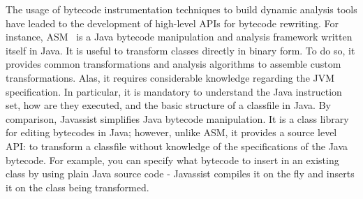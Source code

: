 The usage of bytecode instrumentation techniques to build dynamic analysis tools have leaded to the development of high-level APIs for bytecode rewriting.
For instance, ASM~\cite{Bruneton2002,Kuleshov2007} is a Java bytecode manipulation and analysis framework written itself in Java.
It is useful to transform classes directly in binary form.
To do so, it provides common transformations and analysis algorithms to assemble custom transformations.
Alas, it requires considerable knowledge regarding the JVM specification.
In particular, it is mandatory to understand the Java instruction set, how are they executed, and the basic structure of a classfile in Java.
By comparison, Javassist \cite{Javassist1999} simplifies Java bytecode manipulation.
It is a class library for editing bytecodes in Java; however, unlike ASM, it provides a source level API: to transform a classfile without knowledge of the specifications of the Java bytecode.
For example, you can specify what bytecode to insert in an existing class by using plain Java source code - Javassist compiles it on the fly and inserts it on the class being transformed.

